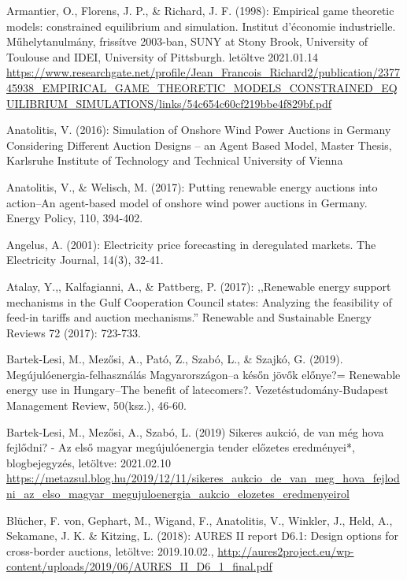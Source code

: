 \documentclass[twoside, magyar, showtrims]{corvinusphd}
\begin{document}
\begin{thebibliography}{99}

Armantier, O., Florens, J. P., \& Richard, J. F. (1998): Empirical game theoretic models: constrained equilibrium and simulation. Institut d'économie industrielle. Műhelytanulmány, frissítve 2003-ban, SUNY at Stony Brook, University of Toulouse and IDEI, University of Pittsburgh. letöltve 2021.01.14
\url{https://www.researchgate.net/profile/Jean\_Francois\_Richard2/publication/237745938\_EMPIRICAL\_GAME\_THEORETIC\_MODELS\_CONSTRAINED\_EQUILIBRIUM\_SIMULATIONS/links/54c654c60cf219bbe4f829bf.pdf}

Anatolitis, V. (2016): Simulation of Onshore Wind Power Auctions in Germany Considering Different Auction Designs – an Agent Based Model, Master Thesis, Karlsruhe Institute of Technology and  Technical University of Vienna

Anatolitis, V., \& Welisch, M. (2017): Putting renewable energy auctions into action–An agent-based model of onshore wind power auctions in Germany. Energy Policy, 110, 394-402.

Angelus, A. (2001): Electricity price forecasting in deregulated markets. The Electricity Journal, 14(3), 32-41.

Atalay, Y.,, Kalfagianni, A., \& Pattberg, P. (2017): ,,Renewable energy support mechanisms in the Gulf Cooperation Council states: Analyzing the feasibility of feed-in tariffs and auction mechanisms.'' Renewable and Sustainable Energy Reviews 72 (2017): 723-733.

Bartek-Lesi, M., Mezősi, A., Pató, Z., Szabó, L., \& Szajkó, G. (2019). Megújulóenergia-felhasználás Magyarországon–a későn jövők előnye?= Renewable energy use in Hungary–The benefit of latecomers?. Vezetéstudomány-Budapest Management Review, 50(ksz.), 46-60.

Bartek-Lesi, M., Mezősi, A., Szabó, L. (2019) Sikeres aukció, de van még hova fejlődni? - Az első magyar megújulóenergia tender előzetes eredményei*, blogbejegyzés, letöltve: 2021.02.10
\url{https://metazsul.blog.hu/2019/12/11/sikeres\_aukcio\_de\_van\_meg\_hova\_fejlodni\_az\_elso\_magyar\_megujuloenergia\_aukcio\_elozetes\_eredmenyeirol}

Blücher, F. von, Gephart, M., Wigand, F., Anatolitis, V., Winkler, J., Held, A., Sekamane, J. K. \& Kitzing, L. (2018): AURES II report D6.1: Design options for cross-border auctions, letöltve: 2019.10.02., 
\url{http://aures2project.eu/wp-content/uploads/2019/06/AURES_II_D6_1_final.pdf}


\end{thebibliography}
\end{document}
